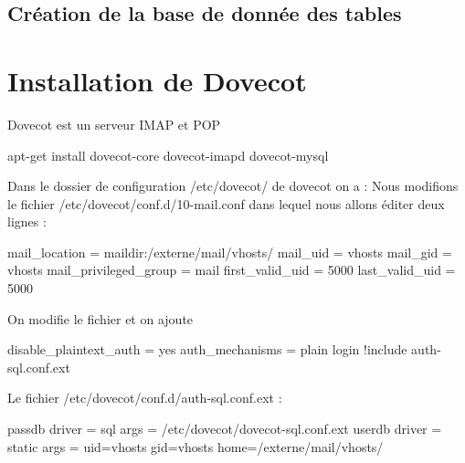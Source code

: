 \documentclass[a4paper,12pt,french]{report} %
\begin{document}
\subsection{Création de la base de donnée des tables}
\section{Installation de Dovecot}
Dovecot est un serveur IMAP et POP 
\begin{exempleConsole}
apt-get install dovecot-core dovecot-imapd dovecot-mysql
\end{exempleConsole}
Dans le dossier de configuration /etc/dovecot/ de dovecot on a :
Nous modifions le fichier /etc/dovecot/conf.d/10-mail.conf dans lequel nous allons éditer deux lignes :
\begin{exempleConsole}
mail_location = maildir:/externe/mail/vhosts/%
mail_uid = vhosts
mail_gid = vhosts
mail_privileged_group = mail
first_valid_uid = 5000
last_valid_uid = 5000
\end{exempleConsole}
On modifie le fichier et on ajoute 
\begin{exempleConsole}
disable_plaintext_auth = yes
auth_mechanisms = plain login
!include auth-sql.conf.ext
\end{exempleConsole}
Le fichier /etc/dovecot/conf.d/auth-sql.conf.ext :
\begin{exempleConsole}
passdb {
  driver = sql
  args = /etc/dovecot/dovecot-sql.conf.ext
}
userdb {
  driver = static
  args = uid=vhosts gid=vhosts home=/externe/mail/vhosts/%
}
\end{exempleConsole}
\end{document}
